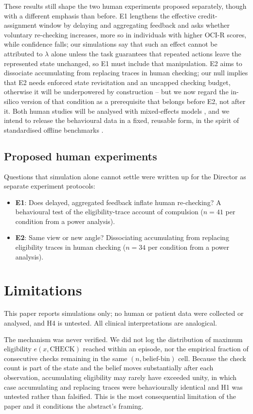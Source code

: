 \documentclass[11pt,a4paper]{article}
\begin{document}
These results still shape the two human experiments proposed separately, though with a different emphasis than before. E1 lengthens the effective credit-assignment window by delaying and aggregating feedback and asks whether voluntary re-checking increases, more so in individuals with higher OCI-R scores, while confidence falls; our simulations say that such an effect cannot be attributed to $\lambda$ alone unless the task guarantees that repeated actions leave the represented state unchanged, so E1 must include that manipulation. E2 aims to dissociate accumulating from replacing traces in human checking; our null implies that E2 needs enforced state revisitation and an uncapped checking budget, otherwise it will be underpowered by construction -- but we now regard the in-silico version of that condition as a prerequisite that belongs before E2, not after it. Both human studies will be analysed with mixed-effects models \citep{bates2015fitting}, and we intend to release the behavioural data in a fixed, reusable form, in the spirit of standardised offline benchmarks \citep{fu2020datasets}.

\subsection*{Proposed human experiments}
Questions that simulation alone cannot settle were written up for the Director as separate experiment protocols:
\begin{itemize}
  \item \textbf{E1}: Does delayed, aggregated feedback inflate human re-checking? A behavioural test of the eligibility-trace account of compulsion ($n = 41$ per condition from a power analysis).
  \item \textbf{E2}: Same view or new angle? Dissociating accumulating from replacing eligibility traces in human checking ($n = 34$ per condition from a power analysis).
\end{itemize}
\section{Limitations}
This paper reports simulations only; no human or patient data were collected or analysed, and H4 is untested. All clinical interpretations are analogical.

The mechanism was never verified. We did not log the distribution of maximum eligibility $e(x,\mathrm{CHECK})$ reached within an episode, nor the empirical fraction of consecutive checks remaining in the same $(n, \text{belief-bin})$ cell. Because the check count is part of the state and the belief moves substantially after each observation, accumulating eligibility may rarely have exceeded unity, in which case accumulating and replacing traces were behaviourally identical and H1 was untested rather than falsified. This is the most consequential limitation of the paper and it conditions the abstract's framing.
\end{document}
